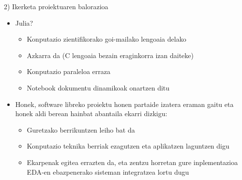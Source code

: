 \documentclass[
 10pt,%
 compress,%
 t,       %
 xcolor=svgnames
]{beamer}
\theoremstyle{definition} \newtheorem{definicion}{Definicion}[section]
\theoremstyle{propiedades} \newtheorem{propiedades}{Propiedades}[section]
\begin{document}
\begin{frame}{2) Ikerketa proiektuaren balorazioa}
{\begin{itemize}
\item Julia?

\begin{itemize}
	
	\medskip
	\item Konputazio zientifikorako goi-mailako lengoaia delako %
	
	\medskip
	\item Azkarra da (C lengoaia bezain eraginkorra izan daiteke) 
	
	\medskip
	\item Konputazio paraleloa erraza
	
	\medskip
	\item Notebook dokumentu dinamikoak onartzen ditu

\end{itemize}

    \medskip
\item  Honek, software libreko proiektu honen partaide izatera eraman gaitu eta honek aldi berean hainbat  abantaila ekarri dizkigu:

\begin{itemize}
	
	\item Guretzako berrikuntzen leiho bat da
	
	\medskip
	\item Konputazio teknika berriak ezagutzen eta aplikatzen laguntzen digu
	
	\medskip
	\item Ekarpenak egitea errazten da, eta zentzu horretan gure inplementazioa EDA-en ebazpenerako sisteman integratzea lortu dugu
	
\end{itemize}

\end{itemize}

}

\end{frame}




\end{document}
